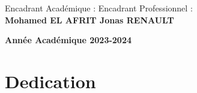 \documentclass[a4paper, oneside, 12pt, final]{extreport}
\newcommand{\studyDepartment} {%
  Entreprise d'accueil :
  
}
\newcommand{\AU} {
\centering \textbf{Année Académique 2023-2024}
}
\begin{document}
\begin{titlepage}
\begin{center}
    Encadrant Académique : \hfill Encadrant Professionnel :\\
    \vspace{10pt}
    \textbf{Mohamed EL AFRIT \hfill  Jonas RENAULT}



    \vspace{40pt}
  \end{center}
  \vspace{40pt}
  \AU\\
\end{titlepage}

%



\chapter*{Dedication}
\thispagestyle{empty}
%
\end{document}
